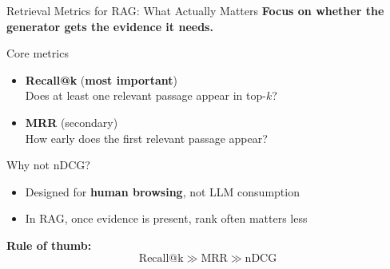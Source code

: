\documentclass[aspectratio=169, xcolor=table]{beamer}
\newif\ifanimated
\newcommand{\cpause}{\ifanimated\pause\fi}
\begin{document}
\begin{frame}[shrink=10]{Retrieval Metrics for RAG: What Actually Matters}
\textbf{Focus on whether the generator gets the evidence it needs.}

\vspace{0.7em}
\begin{block}{Core metrics}
\begin{itemize}
  \item \textbf{Recall@k} (\textbf{most important}) \\
  Does at least one relevant passage appear in top-$k$?

  \item \textbf{MRR} (secondary) \\
  How early does the first relevant passage appear?

\end{itemize}
\end{block}

\cpause
\begin{block}{Why not nDCG?}
\begin{itemize}
  \item Designed for \textbf{human browsing}, not LLM consumption
  \item In RAG, once evidence is present, rank often matters less
\end{itemize}
\end{block}

\vspace{0.5em}
\textbf{Rule of thumb:}
\[
\text{Recall@k} \gg \text{MRR} \gg \text{nDCG}
\]
\end{frame}
\end{document}
